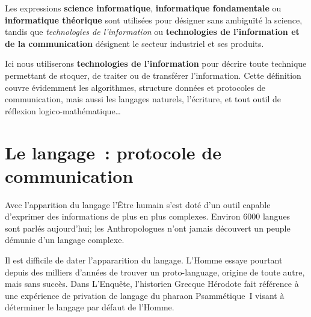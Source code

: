 \begin{coolquote}
Les expressions \textbf{science informatique}, \textbf{informatique fondamentale} ou \textbf{informatique théorique} sont utilisées pour désigner sans ambiguïté la science, tandis que \emph{technologies de l'information} ou \textbf{technologies de l'information et de la communication} désignent le secteur industriel et ses produits.
\end{coolquote}

Ici nous utiliserons \textbf{technologies de l'information} pour décrire toute technique permettant de stoquer, de traiter ou de transférer l'information. Cette définition couvre évidemment les algorithmes, structure données et protocoles de communication, mais aussi les langages naturels, l'écriture, et tout outil de réflexion logico-mathématique\ldots

\chapter{Le langage~: protocole de communication}
Avec l'apparition du langage l'Être humain s'est doté d'un outil capable d'exprimer des informations de plus en plus complexes. Environ 6000 langues sont parlés aujourd'hui; les Anthropologues n'ont jamais découvert un peuple démunie d'un langage complexe\cite{linguistics-pinker}. 

Il est difficile de dater l'appararition du langage. L'Homme essaye pourtant depuis des milliers d'années de trouver un \og{}proto-language\fg{}, origine de toute autre, mais sans succès. Dans \og{}L'Enquête\fg{}, l'historien Grecque Hérodote fait référence à une expérience de \og{}privation de langage\fg{} du pharaon Psammétique~I visant à déterminer le langage \og{}par défaut\fg{} de l'Homme\cite{herodote-privation}. 

